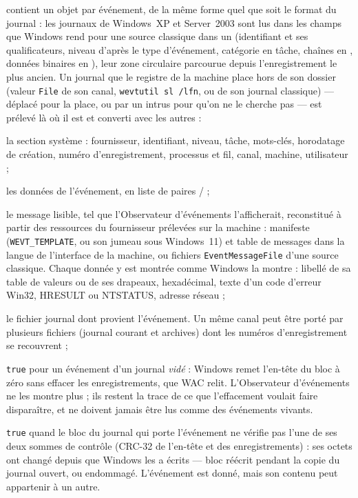 \documentclass[11pt,a4paper,oneside]{report}
\begin{document}
 contient un objet par événement, de la même forme
quel que soit le format du journal : les journaux  de
Windows~XP et Server~2003 sont lus dans les champs que Windows rend pour une
source classique dans un  (identifiant et ses qualificateurs,
niveau d'après le type d'événement, catégorie en tâche, chaînes en
, données binaires en ), leur zone circulaire
parcourue depuis l'enregistrement le plus ancien. Un journal que le registre
de la machine place hors de son dossier (valeur \texttt{File} de son canal,
\texttt{wevtutil sl /lfn}, ou de son journal classique) — déplacé pour la
place, ou par un intrus pour qu'on ne le cherche pas — est prélevé là où il
est et converti avec les autres :

\begin{description}[style=nextline,leftmargin=1.2em]
  \item[\champ{EvtSystem*}] la section système : fournisseur, identifiant,
        niveau, tâche, mots-clés, horodatage de création, numéro d'enregistrement,
        processus et fil, canal, machine, utilisateur ;
  \item[\champ{EvtEventData}] les données de l'événement, en liste de paires
         /  ;
  \item[\champ{EvtEventMessage}] le message lisible, tel que l'Observateur
        d'événements l'afficherait, reconstitué à partir des ressources du
        fournisseur prélevées sur la machine : manifeste (\texttt{WEVT\_TEMPLATE},
        ou son jumeau  sous
        Windows~11) et table de messages dans la langue de l'interface de la
        machine, ou fichiers \texttt{EventMessageFile} d'une source classique.
        Chaque donnée y est montrée comme Windows la montre : libellé de sa
        table de valeurs ou de ses drapeaux, hexadécimal, texte d'un code
        d'erreur Win32, HRESULT ou NTSTATUS, adresse réseau ;
  \item[\champ{EvtSourceLog}] le fichier journal dont provient l'événement. Un
        même canal peut être porté par plusieurs fichiers (journal courant et
        archives) dont les numéros d'enregistrement se recouvrent ;
  \item[\champ{EvtRecovered}] \texttt{true} pour un événement d'un journal
        \emph{vidé} : Windows remet l'en-tête du bloc à zéro sans effacer les
        enregistrements, que WAC relit. L'Observateur d'événements ne les montre
        plus ; ils restent la trace de ce que l'effacement voulait faire
        disparaître, et ne doivent jamais être lus comme des événements vivants.
  \item[\champ{EvtChunkChecksumMismatch}] \texttt{true} quand le bloc du
        journal qui porte l'événement ne vérifie pas l'une de ses deux sommes
        de contrôle (CRC-32 de l'en-tête et des enregistrements) : ses octets
        ont changé depuis que Windows les a écrits --- bloc réécrit pendant la
        copie du journal ouvert, ou endommagé. L'événement est donné, mais son
        contenu peut appartenir à un autre.
\end{description}
\end{document}
